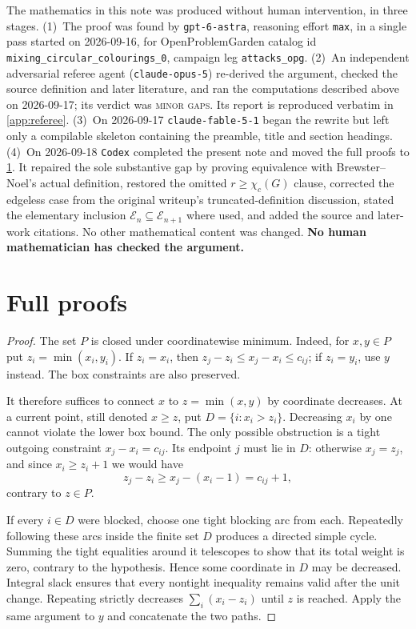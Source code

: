 \documentclass[11pt,a4paper]{article}
\theoremstyle{plain}
\theoremstyle{definition}
\theoremstyle{remark}
\newcommand{\cE}{\mathcal E}
\newcommand{\chic}{\chi_c}
\begin{document}
The mathematics in this note was produced without human intervention, in three stages.
(1)~The proof was found by \texttt{gpt-6-astra}, reasoning effort \texttt{max}, in a
single pass started on 2026-09-16, for OpenProblemGarden catalog id
\texttt{mixing\_circular\_colourings\_0}, campaign leg \texttt{attacks\_opg}.
(2)~An independent adversarial referee agent (\texttt{claude-opus-5}) re-derived the
argument, checked the source definition and later literature, and ran the computations
described above on 2026-09-17; its verdict was \textsc{minor gaps}.  Its report is
reproduced verbatim in \cref{app:referee}.
(3)~On 2026-09-17 \texttt{claude-fable-5-1} began the rewrite but left only a
compilable skeleton containing the preamble, title and section headings.
(4)~On 2026-09-18 \texttt{Codex} completed the present note and moved the full proofs
to \cref{app:proofs}.  It repaired the sole substantive gap by proving equivalence with
Brewster--Noel's actual definition, restored the omitted $r\ge\chic(G)$ clause,
corrected the edgeless case from the original writeup's truncated-definition discussion,
stated the elementary inclusion $\cE_n\subseteq\cE_{n+1}$ where used, and added the
source and later-work citations.  No other mathematical content was changed.
\textbf{No human mathematician has checked the argument.}

\appendix
\section{Full proofs}\label{app:proofs}

\label{pf:unit}
\lemunit*
\begin{proof}
The set $P$ is closed under coordinatewise minimum.  Indeed, for $x,y\in P$ put
$z_i=\min(x_i,y_i)$.  If $z_i=x_i$, then
$z_j-z_i\le x_j-x_i\le c_{ij}$; if $z_i=y_i$, use $y$ instead.  The box constraints
are also preserved.

It therefore suffices to connect $x$ to $z=\min(x,y)$ by coordinate decreases.  At a
current point, still denoted $x\ge z$, put $D=\{i:x_i>z_i\}$.  Decreasing $x_i$ by one
cannot violate the lower box bound.  The only possible obstruction is a tight outgoing
constraint $x_j-x_i=c_{ij}$.  Its endpoint $j$ must lie in $D$: otherwise $x_j=z_j$,
and since $x_i\ge z_i+1$ we would have
\[
 z_j-z_i\ge x_j-(x_i-1)=c_{ij}+1,
\]
contrary to $z\in P$.

If every $i\in D$ were blocked, choose one tight blocking arc from each.  Repeatedly
following these arcs inside the finite set $D$ produces a directed simple cycle.
Summing the tight equalities around it telescopes to show that its total weight is zero,
contrary to the hypothesis.  Hence some coordinate in $D$ may be decreased.  Integral
slack ensures that every nontight inequality remains valid after the unit change.
Repeating strictly decreases $\sum_i(x_i-z_i)$ until $z$ is reached.  Apply the same
argument to $y$ and concatenate the two paths.
\end{proof}
\end{document}
